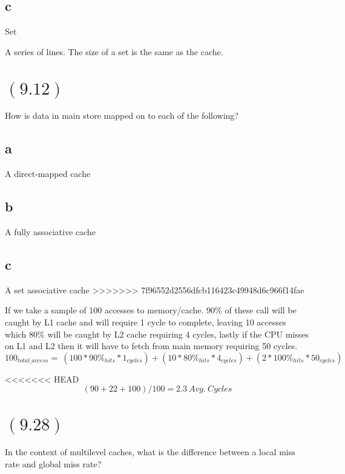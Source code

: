 \documentclass[letterpaper,12pt,titlepage]{article}
\begin{document}
\subsection*{c} Set
\begin{mdframed}[style=MyFrame]
A series of lines. The size of a set is the same as the cache.
\end{mdframed}

\section*{$(9.12)$} How is data in main store mapped on to each of the following?

\subsection*{a} A direct-mapped cache
\begin{mdframed}[style=MyFrame]
\end{mdframed}
\subsection*{b} A fully associative cache
\begin{mdframed}[style=MyFrame]
\end{mdframed}
\subsection*{c} A set associative cache
>>>>>>> 7f96552d2556dfcb116423c49948d6c966f14fae
\begin{mdframed}[style=MyFrame]
If we take a sample of 100 accesses to memory/cache. 90\% of these call will be caught by L1 cache and will require 1 cycle to complete, leaving 10 accesses which 80\% will be caught by L2 cache requiring 4 cycles, lastly if the CPU misses on L1 and L2 then it will have to fetch from main memory requiring 50 cycles. 
\begin{equation*}
100_{total\_access} = ~(100*90\%_{hits}*1_{cycles})+(10*80\%_{hits}*4_{cycles})+(2*100\%_{hits}*50_{cycles})
\end{equation*}

<<<<<<< HEAD
\begin{equation*}
(90+22+100)/100=2.3 ~Avg.~Cycles
\end{equation*}

\end{mdframed}

\section*{$(9.28)$} In the context of multilevel caches, what is the difference between a local miss rate and global miss rate?
\end{document}
